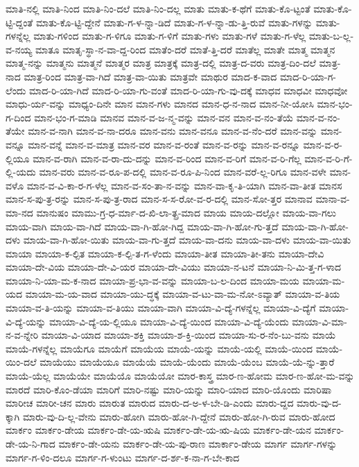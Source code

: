 {ಮಾತಿ-ನಲ್ಲಿ
ಮಾತಿ-ನಿಂದ
ಮಾತಿ-ನಿಂ-ದಲೆ
ಮಾತಿ-ನಿಂ-ದಲ್ಲ
ಮಾತು
ಮಾತು-ಕ-ಥೆಗೆ
ಮಾತು-ಕೊ-ಟ್ಟಂತೆ
ಮಾತು-ಕೊ-ಟ್ಟಿ-ದ್ದಂತೆ
ಮಾತು-ಕೊ-ಟ್ಟಿ-ದ್ದೇನೆ
ಮಾತು-ಗ-ಳ-ನ್ನಾ-ಡಿದೆ
ಮಾತು-ಗ-ಳ-ನ್ನಾ-ಡು-ತ್ತಿ-ರುವೆ
ಮಾತು-ಗಳನ್ನು
ಮಾತು-ಗಳನ್ನೆಲ್ಲ
ಮಾತು-ಗಳಿಂದ
ಮಾತು-ಗ-ಳಿಗೂ
ಮಾತು-ಗ-ಳಿಗೆ
ಮಾತು-ಗಳು
ಮಾತು-ಗಳೆ
ಮಾತು-ಗ-ಳೆಲ್ಲ
ಮಾತು-ಬ-ಲ್ಲ-ವ-ನಯ್ಯ
ಮಾತೂ
ಮಾತೃ-ಸ್ಥಾ-ನ-ವಾ-ದ್ದ-ರಿಂದ
ಮಾತೆಂ-ದರೆ
ಮಾತೆ-ತ್ತಿ-ದರೆ
ಮಾತೆಲ್ಲ
ಮಾತೇ
ಮಾತ್ಮ
ಮಾತ್ಮನ
ಮಾತ್ಮ-ನನ್ನು
ಮಾತ್ಮನು
ಮಾತ್ಮನೆ
ಮಾತ್ಮರ
ಮಾತ್ರ
ಮಾತ್ರಕ್ಕೆ
ಮಾತ್ರ-ದಲ್ಲಿ
ಮಾತ್ರ-ದ-ವರು
ಮಾತ್ರ-ದಿಂ-ದಲೆ
ಮಾತ್ರ-ನಾದ
ಮಾತ್ರ-ರಿಂದ
ಮಾತ್ರ-ವಾ-ಗಿದೆ
ಮಾತ್ರ-ವಾ-ಯಿತು
ಮಾತ್ರವೇ
ಮಾಥುರ
ಮಾದ-ಕ-ವಾದ
ಮಾದ-ರಿ-ಯಾ-ಗ-ಲೆಂದು
ಮಾದ-ರಿ-ಯಾ-ಗಿದೆ
ಮಾದ-ರಿ-ಯಾ-ಗು-ವಂತೆ
ಮಾದ-ರಿ-ಯಾ-ಗು-ವು-ದಕ್ಕೆ
ಮಾಧವ
ಮಾಧವೀ
ಮಾಧವೋ
ಮಾಧು-ರ್ಯ-ವನ್ನು
ಮಾಧ್ಯಂ-ದಿನೇ
ಮಾನ
ಮಾನ-ಗಳು
ಮಾನದ
ಮಾನ-ಧ-ನ-ನಾದ
ಮಾನ-ನೀ-ಯೋಸಿ
ಮಾನ-ಭಂ-ಗ-ದಿಂದ
ಮಾನ-ಭಂ-ಗ-ಮಾಡಿ
ಮಾನವ
ಮಾನ-ವ-ಜ-ನ್ಮ-ವನ್ನು
ಮಾನ-ವನ
ಮಾನ-ವ-ನಂ-ತೆಯೆ
ಮಾನ-ವ-ನಂ-ತೆಯೇ
ಮಾನ-ವ-ನಾಗಿ
ಮಾನ-ವ-ನಾ-ದರೂ
ಮಾನ-ವನು
ಮಾನ-ವನೂ
ಮಾನ-ವ-ನೆಂ-ದರೆ
ಮಾನ-ವನ್ನು
ಮಾನ-ವನ್ನೂ
ಮಾನ-ವನ್ನೆ
ಮಾನ-ವ-ಮಾತ್ರ
ಮಾನ-ವರ
ಮಾನ-ವ-ರಂತೆ
ಮಾನ-ವ-ರನ್ನು
ಮಾನ-ವ-ರನ್ನೂ
ಮಾನ-ವ-ರ-ಲ್ಲಿಯೂ
ಮಾನ-ವ-ರಾಗಿ
ಮಾನ-ವ-ರಾ-ದು-ದನ್ನು
ಮಾನ-ವ-ರಿಂದ
ಮಾನ-ವ-ರಿಗೆ
ಮಾನ-ವ-ರಿ-ಗೆಲ್ಲ
ಮಾನ-ವ-ರಿ-ಗೆ-ಲ್ಲಿ-ಯದು
ಮಾನ-ವರು
ಮಾನ-ವ-ರೂ-ಪ-ದಲ್ಲಿ
ಮಾನ-ವ-ರೂ-ಪಿ-ನಿಂದ
ಮಾನ-ವರೆ-ಲ್ಲ-ರಿಗೂ
ಮಾನ-ವಳೇ
ಮಾನ-ವಳೊ
ಮಾನ-ವ-ವಿ-ಕಾ-ರ-ಗ-ಳೆಲ್ಲ
ಮಾನ-ವ-ಸಂ-ತಾ-ನ-ವನ್ನು
ಮಾನ-ವಾ-ಕೃ-ತಿ-ಯಾಗಿ
ಮಾನ-ವಾ-ತೀತ
ಮಾನಸ
ಮಾನ-ಸ-ಪು-ತ್ರ-ರನ್ನು
ಮಾನ-ಸ-ಪು-ತ್ರ-ರಾದ
ಮಾನ-ಸ-ಸ-ರೋ-ವ-ರ-ದಲ್ಲಿ
ಮಾನ-ಸೋ-ತ್ತರ
ಮಾನಾವ
ಮಾನಾ-ವ-ಮಾ-ನದ
ಮಾನುಷಂ
ಮಾಮು-ಗ್ರ-ಧ-ರ್ಮಾ-ದ-ಖಿ-ಲಾ-ತ್ಪ್ರ-ಮಾದ
ಮಾಯ
ಮಾಯ-ದಲ್ಲೋ
ಮಾಯ-ವಾ-ಗಲು
ಮಾಯ-ವಾಗಿ
ಮಾಯ-ವಾ-ಗಿದೆ
ಮಾಯ-ವಾ-ಗಿ-ಹೋ-ಗಿದ್ದ
ಮಾಯ-ವಾ-ಗಿ-ಹೋ-ಗು-ತ್ತದೆ
ಮಾಯ-ವಾ-ಗಿ-ಹೋ-ದಳು
ಮಾಯ-ವಾ-ಗಿ-ಹೋ-ಯಿತು
ಮಾಯ-ವಾ-ಗು-ತ್ತದೆ
ಮಾಯ-ವಾ-ದನು
ಮಾಯ-ವಾ-ದಳು
ಮಾಯ-ವಾ-ಯಿತು
ಮಾಯಾ
ಮಾಯಾ-ಕ-ಲ್ಪಿತ
ಮಾಯಾ-ಕ-ಲ್ಪಿ-ತ-ಗ-ಳೆಂದು
ಮಾಯಾ-ತೀತ
ಮಾಯಾ-ತೀ-ತನು
ಮಾಯಾ-ದೇವಿ
ಮಾಯಾ-ದೇ-ವಿಯ
ಮಾಯಾ-ದೇ-ವಿ-ಯರ
ಮಾಯಾ-ದೇ-ವಿಯು
ಮಾಯಾ-ನ-ಟನೆ
ಮಾಯಾ-ನಿ-ಮಿ-ತ್ತ-ಗ-ಳಾದ
ಮಾಯಾ-ನಿ-ಯಾ-ಮ-ಕ-ನಾದ
ಮಾಯಾ-ಪ್ರ-ಭಾ-ವ-ವನ್ನು
ಮಾಯಾ-ಬ-ಲ-ದಿಂದ
ಮಾಯಾ-ಮಯ
ಮಾಯಾ-ಮ-ಯದ
ಮಾಯಾ-ಮ-ಯ-ವಾದ
ಮಾಯಾ-ಯು-ದ್ಧಕ್ಕೆ
ಮಾಯಾ-ವ-ಟು-ವಾ-ಮ-ನೋ-ಽವ್ಯಾತ್
ಮಾಯಾ-ವ-ತಿಯ
ಮಾಯಾ-ವ-ತಿ-ಯನ್ನು
ಮಾಯಾ-ವ-ತಿಯು
ಮಾಯಾ-ವಾಗಿ
ಮಾಯಾ-ವಿ-ದ್ಯೆ-ಗಳನ್ನೆಲ್ಲ
ಮಾಯಾ-ವಿ-ದ್ಯೆಗೆ
ಮಾಯಾ-ವಿ-ದ್ಯೆ-ಯನ್ನು
ಮಾಯಾ-ವಿ-ದ್ಯೆ-ಯ-ಲ್ಲಿಯೂ
ಮಾಯಾ-ವಿ-ದ್ಯೆ-ಯಿಂದ
ಮಾಯಾ-ವಿ-ದ್ಯೆ-ಯೆಂದು
ಮಾಯಾ-ವಿ-ಮಾ-ನ-ವ-ನ್ನೇರಿ
ಮಾಯಾ-ವಿ-ಯಾದ
ಮಾಯಾ-ಶಕ್ತಿ
ಮಾಯಾ-ಶ-ಕ್ತಿ-ಯಿಂದ
ಮಾಯಾ-ಸು-ರ-ನೆಂ-ಬು-ವನು
ಮಾಯೆ
ಮಾಯೆ-ಗಳನ್ನೆಲ್ಲ
ಮಾಯೆಗೂ
ಮಾಯೆಗೆ
ಮಾಯೆಯ
ಮಾಯೆ-ಯನ್ನು
ಮಾಯೆ-ಯಲ್ಲಿ
ಮಾಯೆ-ಯಿಂದ
ಮಾಯೆ-ಯಿಂ-ದಲೆ
ಮಾಯೆಯು
ಮಾಯೆಯೂ
ಮಾಯೆಯೆ
ಮಾಯೆ-ಯೆಂದು
ಮಾಯೆ-ಯೆಂಬ
ಮಾಯೆ-ಯೆ-ನ್ನು-ತ್ತಾರೆ
ಮಾಯೆ-ಯೆಲ್ಲ
ಮಾಯೆಯೇ
ಮಾಯೆಯೊ
ಮಾಯೆಯೋ
ಮಾರ-ಕಾಸ್ತ್ರ
ಮಾರ-ಣ-ಹೋಮ
ಮಾರ-ಣ-ಹೋ-ಮ-ವನ್ನು
ಮಾರದೆ
ಮಾರಿ-ಕೊಂ-ಡೆಯಾ
ಮಾರಿಗೆ
ಮಾರಿ-ನಷ್ಟು
ಮಾರಿ-ಯನ್ನು
ಮಾರಿ-ಯಾದ
ಮಾರಿ-ಯೊಂದು
ಮಾರಿಷಾ
ಮಾರೀಚ
ಮಾರೀ-ಚನ
ಮಾರು
ಮಾರುತ
ಮಾರುದ
ಮಾರು-ದ-ಅ-ಳ-ಬೇ-ಡಿ-ಎಂದು
ಮಾರು-ದ್ದದ
ಮಾರು-ವು-ದ-ಕ್ಕಾಗಿ
ಮಾರು-ವು-ದಿ-ಲ್ಲ-ವೇನು
ಮಾರು-ಹೋಗಿ
ಮಾರು-ಹೋ-ಗಿ-ದ್ದೇನೆ
ಮಾರು-ಹೋ-ಗಿ-ರುವ
ಮಾರು-ಹೋದ
ಮಾರ್ಕಂ
ಮಾರ್ಕಂ-ಡೇಯ
ಮಾರ್ಕಂ-ಡೇ-ಯ-ಋಷಿ
ಮಾರ್ಕಂ-ಡೇ-ಯ-ಋ-ಷಿಯ
ಮಾರ್ಕಂ-ಡೇ-ಯನ
ಮಾರ್ಕಂ-ಡೇ-ಯ-ನಿ-ಗಾದ
ಮಾರ್ಕಂ-ಡೇ-ಯನು
ಮಾರ್ಕಂ-ಡೇ-ಯ-ಪು-ರಾಣ
ಮಾರ್ಕಾಂ-ಡೇಯ
ಮಾರ್ಗ
ಮಾರ್ಗ-ಗಳನ್ನು
ಮಾರ್ಗ-ಗ-ಳಿಂ-ದಲೂ
ಮಾರ್ಗ-ಗ-ಳುಂಟು
ಮಾರ್ಗ-ದ-ರ್ಶ-ಕ-ನಾ-ಗ-ಬೇ-ಕಾದ
}

